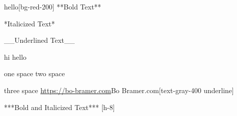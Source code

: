 \begin{Split}
    \begin{Card}{hello}[bg-red-200]
        **Bold Text**
    \end{Card}
    \begin{Card}
        *Italicized Text*
    \end{Card}
\end{Split}

\begin{Split}[mt-8]
    \begin{Card}[bg-green-200]
        __Underlined Text__

        hi
        hello

        one space
        two {space}

        three space
        \url{https://bo-bramer.com}{Bo Bramer.com}[text-gray-400 underline]
    \end{Card}
    \begin{Card}[bg-purple-200]
        ***Bold and Italicized Text***
        [h-8]
    \end{Card}
\end{Split}